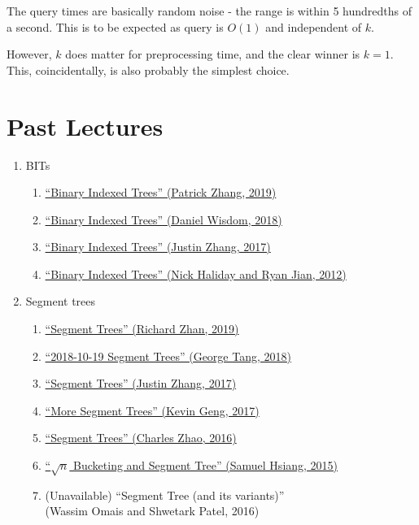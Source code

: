 \documentclass[11pt, oneside]{article}
\begin{document}
The query times are basically random noise - the range is within 5 hundredths of a second.
This is to be expected as query is \( O(1) \) and independent of \( k \).

However, \( k \) does matter for preprocessing time, and the clear winner is \( k = 1 \).
This, coincidentally, is also probably the simplest choice.

\newpage

\section{Past Lectures}

\begin{enumerate}
  \item BITs
    \begin{enumerate}
      \item \href{https://activities.tjhsst.edu/sct/lectures/1920/2019_11_01_Binary_Index_Trees.pdf}{``Binary Indexed Trees'' (Patrick Zhang, 2019)}
      \item \href{https://activities.tjhsst.edu/sct/lectures/1819/2018_11_30_Binary_Indexed_Trees.pdf}{``Binary Indexed Trees'' (Daniel Wisdom, 2018)}
      \item \href{https://activities.tjhsst.edu/sct/lectures/1718/2017-11-10_Binary_Indexed_Trees.pdf}{``Binary Indexed Trees'' (Justin Zhang, 2017)}
      \item \href{https://activities.tjhsst.edu/sct/lectures/1213/bit_09_28_12.pdf}{``Binary Indexed Trees'' (Nick Haliday and Ryan Jian, 2012)}
    \end{enumerate}

  \item Segment trees
    \begin{enumerate}
      \item \href{https://activities.tjhsst.edu/sct/lectures/1920/2019_11_15_Segment_Trees.pdf}{``Segment Trees'' (Richard Zhan, 2019)}
      \item \href{https://activities.tjhsst.edu/sct/lectures/1819/2018_10_19_Segment_Trees.pdf}{``2018-10-19 Segment Trees'' (George Tang, 2018)}
      \item \href{https://activities.tjhsst.edu/sct/lectures/1718/2017-12-08_Segment_Trees.pdf}{``Segment Trees'' (Justin Zhang, 2017)}
      \item \href{https://activities.tjhsst.edu/sct/lectures/1617/2017-01-13_More_Segment_Trees.pdf}{``More Segment Trees'' (Kevin Geng, 2017)}
      \item \href{https://activities.tjhsst.edu/sct/lectures/1617/2016-10-28_Segment_Trees.pdf}{``Segment Trees'' (Charles Zhao, 2016)}
      \item \href{https://activities.tjhsst.edu/sct/lectures/1516/SCT_Segment_Tree.pdf}{``\( \sqrt{n} \) Bucketing and Segment Tree'' (Samuel Hsiang, 2015)}
      \item (Unavailable) ``Segment Tree (and its variants)'' \\ (Wassim Omais and Shwetark Patel, 2016)
    \end{enumerate}


\end{enumerate}
\end{document}
